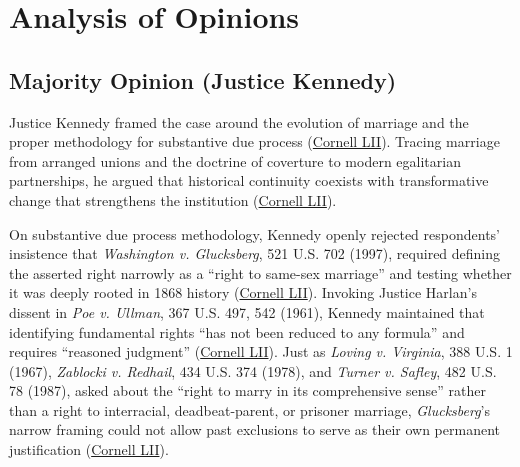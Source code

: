 \documentclass[12pt]{article}
\begin{document}
\section{Analysis of Opinions}

\subsection{Majority Opinion (Justice Kennedy)}

Justice Kennedy framed the case around the evolution of marriage and the proper methodology for substantive due process (\href{https://www.law.cornell.edu/supremecourt/text/14-556}{Cornell LII}). Tracing marriage from arranged unions and the doctrine of coverture to modern egalitarian partnerships, he argued that historical continuity coexists with transformative change that strengthens the institution (\href{https://www.law.cornell.edu/supremecourt/text/14-556}{Cornell LII}).

On substantive due process methodology, Kennedy openly rejected respondents' insistence that \textit{Washington v. Glucksberg}, 521 U.S. 702 (1997), required defining the asserted right narrowly as a ``right to same-sex marriage'' and testing whether it was deeply rooted in 1868 history (\href{https://www.law.cornell.edu/supremecourt/text/14-556}{Cornell LII}). Invoking Justice Harlan's dissent in \textit{Poe v. Ullman}, 367 U.S. 497, 542 (1961), Kennedy maintained that identifying fundamental rights ``has not been reduced to any formula'' and requires ``reasoned judgment'' (\href{https://www.law.cornell.edu/supremecourt/text/14-556}{Cornell LII}). Just as \textit{Loving v. Virginia}, 388 U.S. 1 (1967), \textit{Zablocki v. Redhail}, 434 U.S. 374 (1978), and \textit{Turner v. Safley}, 482 U.S. 78 (1987), asked about the ``right to marry in its comprehensive sense'' rather than a right to interracial, deadbeat-parent, or prisoner marriage, \textit{Glucksberg}'s narrow framing could not allow past exclusions to serve as their own permanent justification (\href{https://www.law.cornell.edu/supremecourt/text/14-556}{Cornell LII}).
\end{document}

